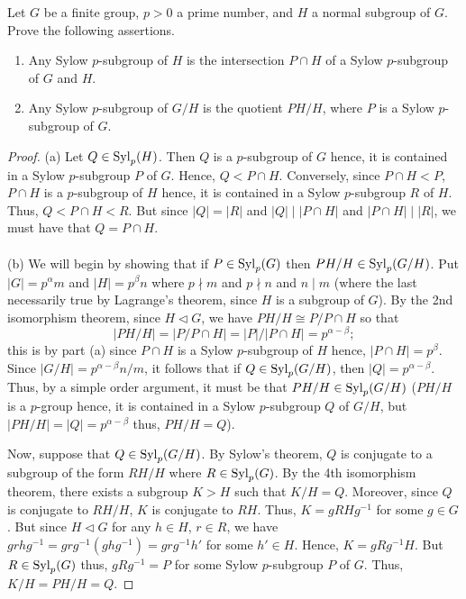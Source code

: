 \begin{problem}
Let $G$ be a finite group, $p>0$ a prime number, and $H$ a
normal subgroup of $G$. Prove the following assertions.
\begin{enumerate}[label=(\alph*)]
\item Any Sylow $p$-subgroup of $H$ is the intersection
$P\cap H$ of a Sylow $p$-subgroup of $G$ and $H$.
\item Any Sylow $p$-subgroup of $G/H$ is the quotient $PH/H$,
where $P$ is a Sylow $p$-subgroup of $G$.
\end{enumerate}
\end{problem}
\begin{proof}
(a) Let $Q\in\operatorname{Syl}_p(H)$. Then $Q$ is a $p$-subgroup of $G$ hence, it is
contained in a Sylow $p$-subgroup $P$ of $G$. Hence, $Q<P\cap
H$. Conversely, since $P\cap H<P$, $P\cap H$ is a $p$-subgroup of $H$
hence, it is contained in a Sylow $p$-subgroup $R$ of $H$. Thus, $Q<P\cap
H<R$. But since $|Q|=|R|$ and $|Q|\mid |P\cap H|$ and $|P\cap H|\mid |R|$,
we must have that $Q=P\cap H$.
\\\\
(b) We will begin by showing that if $P\in\operatorname{Syl}_p(G)$ then
$PH/H\in\operatorname{Syl}_p(G/H)$. Put $|G|=p^\alpha m$ and $|H|=p^\beta n$ where
$p\nmid m$ and $p\nmid n$ and $n\mid m$ (where the last necessarily true by
Lagrange's theorem, since $H$ is a subgroup of $G$). By the 2nd isomorphism
theorem, since $H\lhd G$, we have $PH/H\cong P/P\cap H$ so that
\[
|PH/H|=|P/P\cap H|=|P|/|P\cap H|=p^{\alpha-\beta};
\]
this is by part (a) since $P\cap H$ is a Sylow $p$-subgroup of $H$ hence,
$|P\cap H|=p^\beta$. Since $|G/H|=p^{\alpha-\beta}n/m$, it follows that if
$Q\in\operatorname{Syl}_p(G/H)$, then $|Q|=p^{\alpha-\beta}$. Thus, by a simple order
argument, it must be that $PH/H\in\operatorname{Syl}_p(G/H)$ ($PH/H$ is a $p$-group
hence, it is contained in a Sylow $p$-subgroup $Q$ of $G/H$, but
$|PH/H|=|Q|=p^{\alpha-\beta}$ thus, $PH/H=Q$).

Now, suppose that $Q\in\operatorname{Syl}_p(G/H)$. By Sylow's theorem, $Q$ is conjugate
to a subgroup of the form $RH/H$ where $R\in\operatorname{Syl}_p(G)$. By the 4th
isomorphism theorem, there exists a subgroup $K>H$ such that
$K/H=Q$. Moreover, since $Q$ is conjugate to $RH/H$, $K$ is conjugate to
$RH$. Thus, $K=gRHg^{-1}$ for some $g\in G$. But since $H\lhd G$ for any
$h\in H$, $r\in R$, we have $grhg^{-1}=grg^{-1}(ghg^{-1})=grg^{-1}h'$ for
some $h'\in H$. Hence, $K=gRg^{-1} H$. But $R\in\operatorname{Syl}_p(G)$ thus,
$gRg^{-1}=P$ for some Sylow $p$-subgroup $P$ of $G$. Thus, $K/H=PH/H=Q$.
\end{proof}
